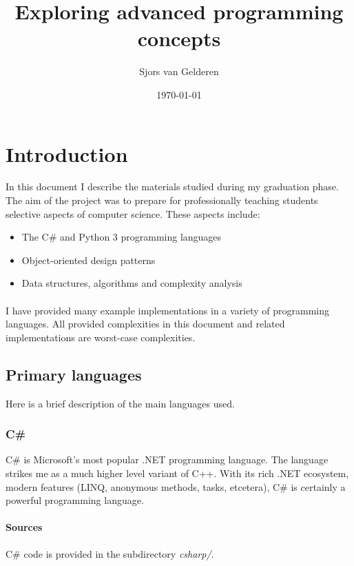 \documentclass{article}
\author{Sjors van Gelderen}
\title{Exploring advanced programming concepts}
\date{\today{}}
\begin{document}
\maketitle{}

\newpage

\tableofcontents{}


\newpage


\section{Introduction}
In this document I describe the materials studied during my graduation phase.
The aim of the project was to prepare for professionally teaching students selective aspects of computer science.
These aspects include:
\begin{itemize}
\item{The C\# and Python 3 programming languages}
\item{Object-oriented design patterns}
\item{Data structures, algorithms and complexity analysis}
\end{itemize}

\paragraph{}
I have provided many example implementations in a variety of programming languages.
All provided complexities in this document and related implementations are worst-case complexities.

\subsection{Primary languages}
Here is a brief description of the main languages used.

\subsubsection{C\#}
C\# is Microsoft's most popular .NET programming language.
The language strikes me as a much higher level variant of C++.
With its rich .NET ecosystem, modern features (LINQ, anonymous methods, tasks, etcetera),
C\# is certainly a powerful programming language.

\paragraph{Sources}
C\# code is provided in the subdirectory {\em csharp/}.
\end{document}
